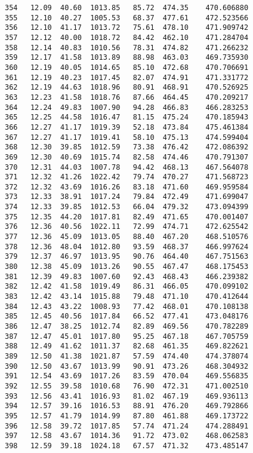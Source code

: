 \documentclass[11pt]{article}
\begin{document}
\begin{tcolorbox}[breakable, size=fbox, boxrule=.5pt, pad at break*=1mm, opacityfill=0]
\begin{Verbatim}[commandchars=\\\{\}]
354   12.09  40.60  1013.85   85.72  474.35    470.606880
355   12.10  40.27  1005.53   68.37  477.61    472.523566
356   12.10  41.17  1013.72   75.61  478.10    471.909742
357   12.12  40.00  1018.72   84.42  462.10    471.284704
358   12.14  40.83  1010.56   78.31  474.82    471.266232
359   12.17  41.58  1013.89   88.98  463.03    469.735930
360   12.19  40.05  1014.65   85.10  472.68    470.706691
361   12.19  40.23  1017.45   82.07  474.91    471.331772
362   12.19  44.63  1018.96   80.91  468.91    470.526925
363   12.23  41.58  1018.76   87.66  464.45    470.209217
364   12.24  49.83  1007.90   94.28  466.83    466.283253
365   12.25  44.58  1016.47   81.15  475.24    470.185943
366   12.27  41.17  1019.39   52.18  473.84    475.461384
367   12.27  41.17  1019.41   58.10  475.13    474.599404
368   12.30  39.85  1012.59   73.38  476.42    472.086392
369   12.30  40.69  1015.74   82.58  474.46    470.791307
370   12.31  44.03  1007.78   94.42  468.13    467.564078
371   12.32  41.26  1022.42   79.74  470.27    471.568723
372   12.32  43.69  1016.26   83.18  471.60    469.959584
373   12.33  38.91  1017.24   79.84  472.49    471.699047
374   12.33  39.85  1012.53   66.04  479.32    473.094399
375   12.35  44.20  1017.81   82.49  471.65    470.001407
376   12.36  40.56  1022.11   72.99  474.71    472.625542
377   12.36  45.09  1013.05   88.40  467.20    468.510576
378   12.36  48.04  1012.80   93.59  468.37    466.997624
379   12.37  46.97  1013.95   90.76  464.40    467.751563
380   12.38  45.09  1013.26   90.55  467.47    468.175453
381   12.39  49.83  1007.60   92.43  468.43    466.239382
382   12.42  41.58  1019.49   86.31  466.05    470.099102
383   12.42  43.14  1015.88   79.48  471.10    470.412644
384   12.43  43.22  1008.93   77.42  468.01    470.108138
385   12.45  40.56  1017.84   66.52  477.41    473.048176
386   12.47  38.25  1012.74   82.89  469.56    470.782289
387   12.47  45.01  1017.80   95.25  467.18    467.705759
388   12.49  41.62  1011.37   82.68  461.35    469.822621
389   12.50  41.38  1021.87   57.59  474.40    474.378074
390   12.50  43.67  1013.99   90.91  473.26    468.304932
391   12.54  43.69  1017.26   83.59  470.04    469.556835
392   12.55  39.58  1010.68   76.90  472.31    471.002510
393   12.56  43.41  1016.93   81.02  467.19    469.936113
394   12.57  39.16  1016.53   88.91  476.20    469.792866
395   12.57  41.79  1014.99   87.80  461.88    469.173722
396   12.58  39.72  1017.85   57.74  471.24    474.288491
397   12.58  43.67  1014.36   91.72  473.02    468.062583
398   12.59  39.18  1024.18   67.57  471.32    473.485147

\end{Verbatim}
\end{tcolorbox}
\end{document}
